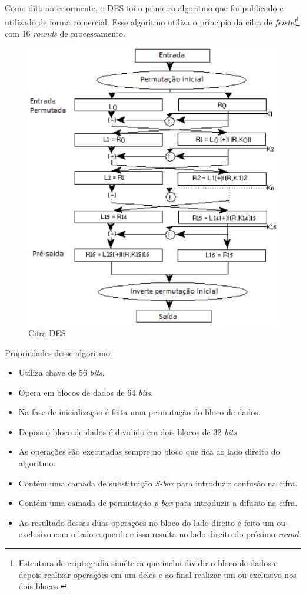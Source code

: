 Como dito anteriormente, o DES foi o primeiro algoritmo que foi publicado e utilizado de forma comercial. Esse algoritmo utiliza o príncipio da cifra de \textit{feistel}\footnote{Estrutura de criptografia simétrica que inclui dividir o bloco de dados e depois realizar operações em um deles e ao final realizar um ou-exclusivo nos dois blocos.} com 16 \textit{rounds} de processamento.

\begin{figure}[h]
	\centering
	\includegraphics[scale=0.8]
		{figuras/des_cipher.eps}
		\caption[Cifra \textit{DES}]{Cifra DES\protect\footnotemark} 
\end{figure}

Propriedades desse algoritmo:

\begin{itemize}
	\item Utiliza chave de 56 \textit{bits}.
	\item Opera em blocos de dados de 64 \textit{bits}.
	\item Na fase de inicialização é feita uma permutação do bloco de dados.
	\item Depois o bloco de dados é dividido em dois blocos de 32 \textit{bits}
	\item As operações são executadas sempre no bloco que fica ao lado direito do algoritmo.
	\item Contém uma camada de substituição \textit{S-box} para introduzir confusão na cifra.
	\item Contém uma camada de permutação \textit{p-box} para introduzir a difusão na cifra.
	\item Ao resultado dessas duas operações no bloco do lado direito é feito um ou-exclusivo com o lado esquerdo e isso resulta no lado direito do próximo \textit{round}.
\end{itemize}


